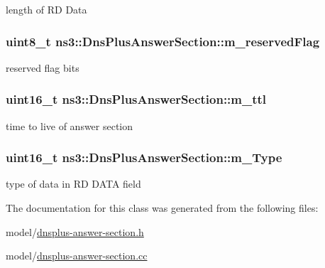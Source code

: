 length of R\-D Data 

\hypertarget{classns3_1_1DnsPlusAnswerSection_ab7c55e4309c4e3ea9d2f6cee4f51a5a9}{
\subsubsection[{m\-\_\-reserved\-Flag}]{\setlength{\rightskip}{0pt plus 5cm}uint8\-\_\-t ns3\-::\-Dns\-Plus\-Answer\-Section\-::m\-\_\-reserved\-Flag\hspace{0.3cm}{\ttfamily [private]}}}\label{classns3_1_1DnsPlusAnswerSection_ab7c55e4309c4e3ea9d2f6cee4f51a5a9}


reserved flag bits 

\hypertarget{classns3_1_1DnsPlusAnswerSection_a2b8a98168673224b6575ab009e883d2f}{
\subsubsection[{m\-\_\-ttl}]{\setlength{\rightskip}{0pt plus 5cm}uint16\-\_\-t ns3\-::\-Dns\-Plus\-Answer\-Section\-::m\-\_\-ttl\hspace{0.3cm}{\ttfamily [private]}}}\label{classns3_1_1DnsPlusAnswerSection_a2b8a98168673224b6575ab009e883d2f}


time to live of answer section 

\hypertarget{classns3_1_1DnsPlusAnswerSection_aa1a416336d5681c959c988c299a6cddf}{
\subsubsection[{m\-\_\-\-Type}]{\setlength{\rightskip}{0pt plus 5cm}uint16\-\_\-t ns3\-::\-Dns\-Plus\-Answer\-Section\-::m\-\_\-\-Type\hspace{0.3cm}{\ttfamily [private]}}}\label{classns3_1_1DnsPlusAnswerSection_aa1a416336d5681c959c988c299a6cddf}


type of data in R\-D D\-A\-T\-A field 



The documentation for this class was generated from the following files\-:\begin{DoxyCompactItemize}
\item 
model/\hyperlink{dnsplus-answer-section_8h}{dnsplus-\/answer-\/section.\-h}\item 
model/\hyperlink{dnsplus-answer-section_8cc}{dnsplus-\/answer-\/section.\-cc}\end{DoxyCompactItemize}
